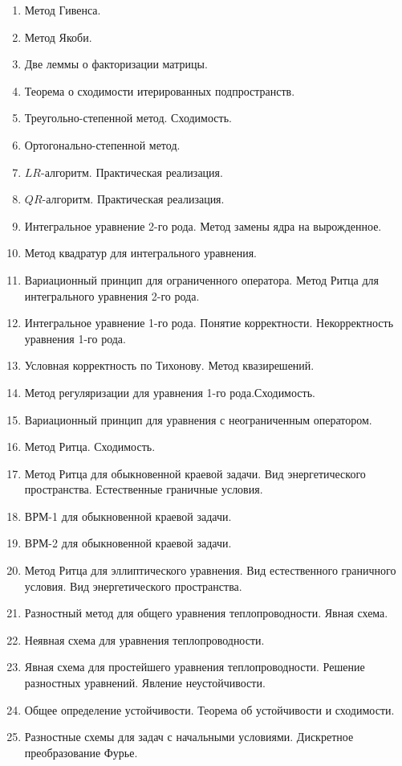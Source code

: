 \documentclass{trnotes}
\begin{document}
\begin{enumerate}
\item Метод Гивенса.
\item Метод Якоби.
\item Две леммы о факторизации матрицы.
\item Теорема о сходимости итерированных подпространств.
\item Треугольно-степенной метод. Сходимость.
\item Ортогонально-степенной метод.
\item $LR$-алгоритм. Практическая реализация.
\item $QR$-алгоритм. Практическая реализация.
\item Интегральное уравнение 2-го рода. Метод замены ядра на вырожденное.
\item Метод квадратур для интегрального уравнения.
\item Вариационный принцип для ограниченного оператора. Метод Ритца для интегрального уравнения 2-го рода.
\item Интегральное уравнение 1-го рода. Понятие корректности. Некорректность уравнения 
1-го рода.
\item Условная корректность по Тихонову. Метод квазирешений.
\item Метод регуляризации для уравнения 1-го рода.Сходимость.
\item Вариационный принцип для уравнения с неограниченным оператором.
\item Метод Ритца. Сходимость.
\item Метод Ритца для обыкновенной краевой задачи. Вид энергетического пространства.
Естественные граничные условия.
\item ВРМ-1 для обыкновенной краевой задачи.
\item ВРМ-2 для обыкновенной краевой задачи.
\item Метод Ритца для эллиптического уравнения. Вид естественного граничного условия.
Вид энергетического пространства.
\item Разностный метод для общего уравнения теплопроводности. Явная схема.
\item Неявная схема для уравнения теплопроводности.
\item Явная схема для простейшего уравнения теплопроводности. Решение разностных
уравнений. Явление неустойчивости.
\item Общее определение устойчивости. Теорема об устойчивости и сходимости.
\item Разностные схемы для задач с начальными условиями. Дискретное 
преобразование Фурье.

\end{enumerate}
\end{document}
